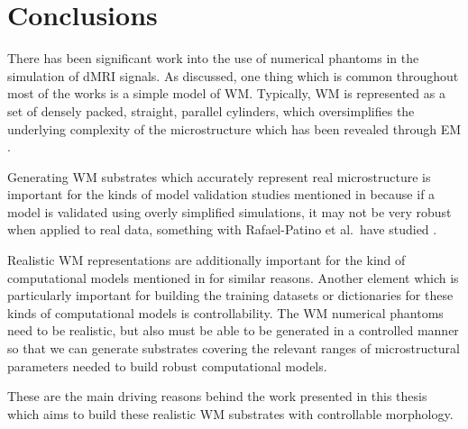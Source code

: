 \section{Conclusions}
\label{sec:review_conclusions}
There has been significant work into the use of numerical phantoms in the simulation of \acl{dMRI} signals.
As discussed, one thing which is common throughout most of the works is a simple model of \ac{WM}.
Typically, \ac{WM} is represented as a set of densely packed, straight, parallel cylinders, which oversimplifies the underlying complexity of the microstructure which has been revealed through \ac{EM} \cite{Abdollahzadeh2019,Lee2019b}.

Generating \ac{WM} substrates which accurately represent real microstructure is important for the kinds of model validation studies mentioned in  because if a model is validated using overly simplified simulations, it may not be very robust when applied to real data, something with Rafael-Patino et al.\ have studied \cite{Rafael-patino2020}.

Realistic \ac{WM} representations are additionally important for the kind of computational models mentioned in  for similar reasons.
Another element which is particularly important for building the training datasets or dictionaries for these kinds of computational models is controllability.
The \ac{WM} numerical phantoms need to be realistic, but also must be able to be generated in a controlled manner so that we can generate substrates covering the relevant ranges of microstructural parameters needed to build robust computational models.

These are the main driving reasons behind the work presented in this thesis which aims to build these realistic \ac{WM} substrates with controllable morphology.


